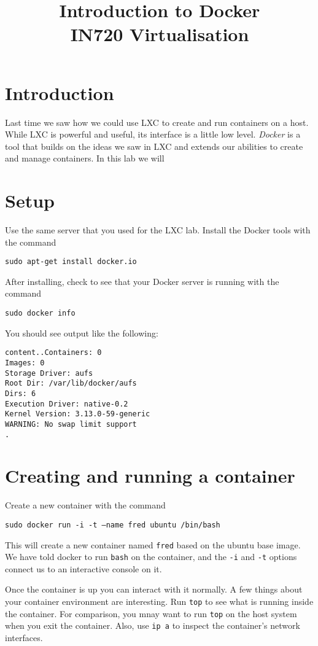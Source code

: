\documentclass{article}
\begin{document}
\title{Introduction to Docker\\ IN720 Virtualisation}
\date{}
\maketitle

\section*{Introduction}
Last time we saw how we could use LXC to create and run containers on a host. While LXC is powerful and useful, its interface is a little low level. \emph{Docker} is a tool that builds on the ideas we saw in LXC and extends our abilities to create and manage containers.  In this lab we will 

\section{Setup}
Use the same server that you used for the LXC lab.  Install the Docker tools with the command

\texttt{sudo apt-get install docker.io}

After installing, check to see that your Docker server is running with the command 

\texttt{sudo docker info}

You should see output like the following:

\begin{verbatim}
content..Containers: 0
Images: 0
Storage Driver: aufs
Root Dir: /var/lib/docker/aufs
Dirs: 6
Execution Driver: native-0.2
Kernel Version: 3.13.0-59-generic
WARNING: No swap limit support
.
\end{verbatim}

\section{Creating and running a container}

Create a new container with the command

\texttt{sudo docker run -i -t --name fred ubuntu /bin/bash}

This will create a new container named \texttt{fred} based on the ubuntu base image. We have told docker to run \texttt{bash} on the container, and the \texttt{-i} and \texttt{-t} options connect us to an interactive console on it.  

Once the container is up you can interact with it normally.  A few things about your container environment are interesting. Run \texttt{top} to see what is running inside the container.  For comparison, you mnay want to run \texttt{top} on the host system when you exit the container.  Also, use \texttt{ip a} to inspect the container's network interfaces.
\end{document}
